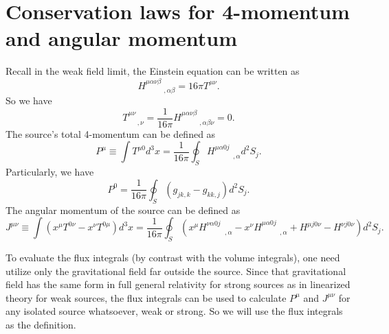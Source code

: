\documentclass[cyan]{elegantnote}
\begin{document}
\section{Conservation laws for 4-momentum and angular momentum}
Recall in the weak field limit, the Einstein equation can be written as
\[H^{\mu\alpha\nu\beta}_{\phantom{****},\alpha
\beta} = 16\pi T^{\mu\nu}.\]
So we have
\[T^{\mu\nu}_{\phantom{**},\nu} = \frac{1}{16\pi}H^{\mu\alpha\nu\beta}_{\phantom{****},\alpha\beta\nu} = 0.\]
The source's total 4-momentum can be defined as
\[P^{\mu} \equiv \int T^{\mu 0}d^3x = \frac{1}{16\pi} \oint_{S} H^{\mu\alpha 0 j}_{\phantom{****},\alpha} d^2 S_j .\]
Particularly, we have
\[P^0 = \frac{1}{16\pi} \oint_{S} (g_{jk,k} - g_{kk,j})d^2S_{j} .\]
The angular momentum of the source can be defined as
\[J^{\mu\nu} \equiv \int (x^{\mu} T^{0\nu} - x^{\nu} T^{0\mu}) d^3x  = \frac{1}{16\pi} \oint_S (x^{\mu}H^{\nu\alpha 0 j}_{\phantom{****},\alpha} - x^{\nu}H^{\mu\alpha 0 j}_{\phantom{****},\alpha} + H^{\mu j 0 \nu} - H^{\nu j 0 \nu}) d^2 S_j .\]
\begin{note}
To evaluate the flux integrals (by contrast with the volume
integrals), one need utilize only the gravitational field far outside the source. Since that gravitational field has the same form in full general relativity for strong sources as in linearized theory for weak sources, the flux integrals can be used to calculate $P^{\mu}$ and $J^{\mu\nu}$ for any isolated source whatsoever, weak or strong. So we will use the flux integrals as the definition.
\end{note}
\end{document}
